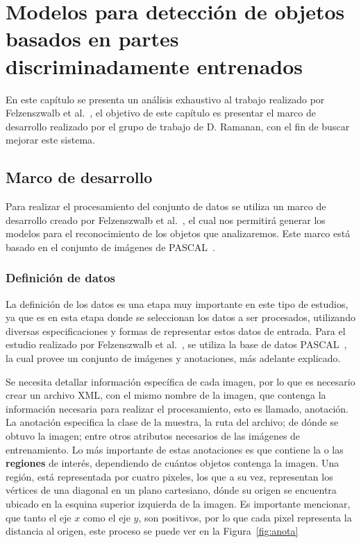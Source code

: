 \chapter[Modelos basados en partes ]{Modelos para detección de objetos basados en partes discriminadamente entrenados }\label{ch:capitulo4}
En este capítulo se presenta un análisis exhaustivo al trabajo realizado por Felzenszwalb et al.~\cite{Felzenszwalb2010}, el objetivo de este capítulo es presentar el marco de desarrollo realizado por el grupo de trabajo de D. Ramanan, con el fin de buscar mejorar este sistema.

\section{Marco de desarrollo}\label{sec:framework}
Para realizar el procesamiento del conjunto de datos se utiliza un marco de desarrollo creado por Felzenszwalb et al.~\cite{Felzenszwalb2010}, el cual nos permitirá generar los modelos para el reconocimiento de los objetos que analizaremos. Este marco está basado en el conjunto de imágenes de PASCAL~\cite{Everingham2010}.

\subsection{Definición de datos}\label{sec:datos}
La definición de los datos es una etapa muy importante en este tipo de estudios, ya que es en esta etapa donde se seleccionan los datos a ser procesados, utilizando diversas especificaciones y formas de representar estos datos de entrada. Para el estudio realizado por Felzenszwalb et al.~\cite{Felzenszwalb2010}, se utiliza la base de datos PASCAL~\cite{Everingham2010}, la cual provee un conjunto de imágenes y anotaciones, más adelante explicado.

Se necesita detallar información específica de cada imagen, por lo que es necesario crear un archivo XML, con el mismo nombre de la imagen, que contenga la información necesaria para realizar el procesamiento, esto es llamado, anotación. La anotación especifica la clase de la muestra, la ruta del archivo; de dónde se obtuvo la imagen; entre otros atributos necesarios de las imágenes de entrenamiento. Lo más importante de estas anotaciones es que contiene la o las \textbf{regiones} de interés, dependiendo de cuántos objetos contenga la imagen. Una región, está representada por cuatro pixeles, los que a su vez, representan los vértices de una diagonal en un plano cartesiano, dónde su origen se encuentra ubicado en la esquina superior izquierda de la imagen. Es importante mencionar, que tanto el eje $x$ como el eje $y$, son positivos, por lo que cada pixel representa la distancia al origen, este proceso se puede ver en la Figura~\ref{fig:anota}

